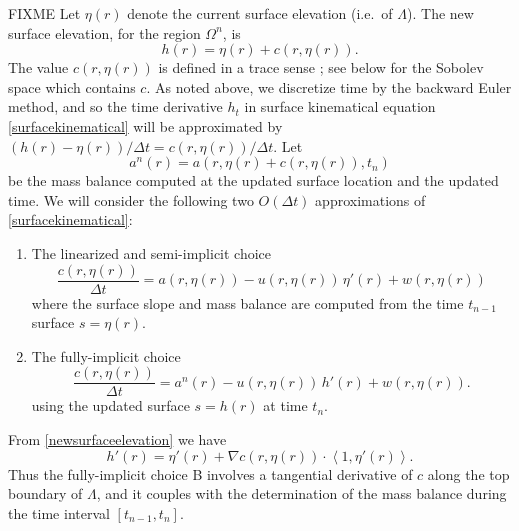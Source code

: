\documentclass[letterpaper,final,12pt,reqno]{amsart}
\newcommand{\grad}{\nabla}
\begin{document}
FIXME Let $\eta(r)$ denote the current surface elevation (i.e.~of $\Lambda$).  The new surface elevation, for the region $\Omega^n$, is
\begin{equation}
h(r) = \eta(r) + c(r,\eta(r)).  \label{newsurfaceelevation}
\end{equation}
The value $c(r,\eta(r))$ is defined in a trace sense \cite{Evans2010}; see below for the Sobolev space which contains $c$.  As noted above, we discretize time by the backward Euler method, and so the time derivative $h_t$ in surface kinematical equation \eqref{surfacekinematical} will be approximated by $(h(r) - \eta(r))/\Delta t = c(r,\eta(r))/\Delta t$.  Let
\begin{equation}
a^n(r) = a\left(r,\eta(r) + c(r,\eta(r)),t_n\right) \label{massbalance}
\end{equation}
be the mass balance computed at the updated surface location and the updated time.  We will consider the following two $O(\Delta t)$ approximations of \eqref{surfacekinematical}:
\renewcommand{\labelenumi}{\Alph{enumi}.}
\begin{enumerate}
\item The linearized and semi-implicit choice
\begin{equation}
\frac{c(r,\eta(r))}{\Delta t} = a(r,\eta(r)) - u(r,\eta(r))\,\eta'(r) + w(r,\eta(r)) \label{surfacesemiimplicit}
\end{equation}
where the surface slope and mass balance are computed from the time $t_{n-1}$ surface $s=\eta(r)$.
\item The fully-implicit choice
\begin{equation}
\frac{c(r,\eta(r))}{\Delta t} = a^n(r) - u(r,\eta(r))\,h'(r) + w(r,\eta(r)). \label{surfaceimplicit}
\end{equation}
using the updated surface $s=h(r)$ at time $t_n$.
\end{enumerate}
From \eqref{newsurfaceelevation} we have
    $$h'(r) = \eta'(r) + \grad c (r,\eta(r)) \cdot \left<1,\eta'(r)\right>.$$
Thus the fully-implicit choice B involves a tangential derivative of $c$ along the top boundary of $\Lambda$, and it couples with the determination of the mass balance during the time interval $[t_{n-1},t_n]$.
\end{document}
